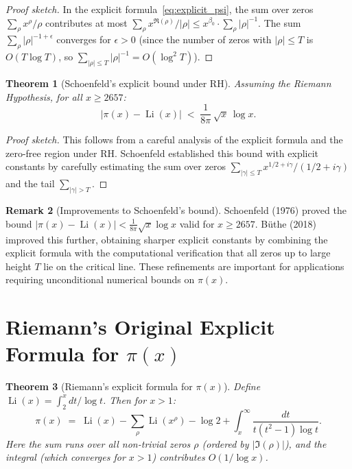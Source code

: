 \documentclass[12pt,a4paper]{amsart}
\newtheorem{theorem}{Theorem}[section]
\theoremstyle{definition}
\newtheorem{remark}[theorem]{Remark}
\DeclareMathOperator{\Li}{Li}
\begin{document}
\begin{proof}[Proof sketch]
In the explicit formula~\eqref{eq:explicit_psi}, the sum over zeros
$\sum_\rho x^\rho/\rho$ contributes at most
$\sum_\rho x^{\Re(\rho)}/|\rho| \le x^{\beta_0} \cdot \sum_\rho |\rho|^{-1}$.
The sum $\sum_\rho |\rho|^{-1+\epsilon}$ converges for $\epsilon > 0$
(since the number of zeros with $|\rho| \le T$ is $O(T\log T)$, so
$\sum_{|\rho|\le T} |\rho|^{-1} = O(\log^2 T)$).
\end{proof}

\begin{theorem}[Schoenfeld's explicit bound under RH]
\label{thm:schoenfeld}
Assuming the Riemann Hypothesis, for all $x \ge 2657$:
\[
  |\pi(x) - \Li(x)| \;<\; \frac{1}{8\pi}\,\sqrt{x}\,\log x.
\]
\end{theorem}

\begin{proof}[Proof sketch]
This follows from a careful analysis of the explicit formula and the
zero-free region under RH.  Schoenfeld \cite{Schoenfeld1976} established
this bound with explicit constants by carefully estimating the sum over
zeros $\sum_{|\gamma| \le T} x^{1/2+i\gamma}/(1/2+i\gamma)$ and the
tail $\sum_{|\gamma| > T}$.
\end{proof}

\begin{remark}[Improvements to Schoenfeld's bound]
Schoenfeld (1976) proved the bound $|\pi(x) - \Li(x)| < \tfrac{1}{8\pi}\sqrt{x}\log x$
valid for $x \ge 2657$.  B\"uthe (2018) improved this further, obtaining
sharper explicit constants by combining the explicit formula with the
computational verification that all zeros up to large height $T$ lie on the
critical line.  These refinements are important for applications requiring
unconditional numerical bounds on $\pi(x)$.
\end{remark}

\section{Riemann's Original Explicit Formula for \texorpdfstring{$\pi(x)$}{pi(x)}}

\begin{theorem}[Riemann's explicit formula for $\pi(x)$]
\label{thm:riemann_explicit}
Define $\Li(x) = \int_2^x dt/\log t$.  Then for $x > 1$:
\begin{equation}
  \label{eq:riemann_explicit}
  \pi(x) \;=\; \Li(x) - \sum_\rho \Li(x^\rho) - \log 2
  + \int_x^{\infty} \frac{dt}{t(t^2-1)\log t}.
\end{equation}
Here the sum runs over all non-trivial zeros $\rho$ (ordered by
$|\Im(\rho)|$), and the integral (which converges for $x > 1$)
contributes $O(1/\log x)$.
\end{theorem}
\end{document}
